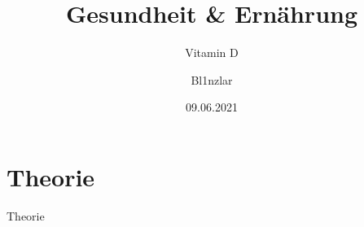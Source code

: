 \documentclass[xcolor=dvipsnames]{beamer}
\title{Gesundheit \& Ernährung}
\subtitle{Vitamin D}
\author{Bl1nzlar}
\date{09.06.2021}
\begin{document}
    \maketitle


    \section{Theorie}
    {
    \begin{frame}
        \begin{center}
            \Huge Theorie
        \end{center}
    \end{frame}
    }
\end{document}

